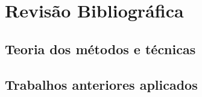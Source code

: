 \chapter{Revisão Bibliográfica}
\label{cap-revisaobibliografica}

\section{Teoria dos métodos e técnicas}
\label{cap-teometetec}


\section{Trabalhos anteriores aplicados}
\label{cap-trabant}

